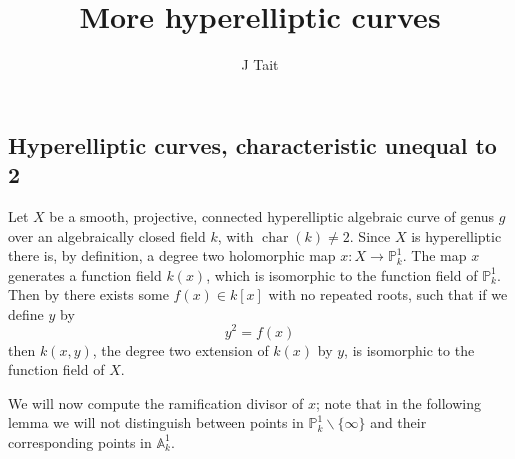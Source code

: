 \documentclass[11pt]{article} %
\title{More hyperelliptic curves}
\author{J Tait}
\theoremstyle{plain}
\theoremstyle{remark}
\DeclareMathOperator{\cha}{char}
\begin{document}
\maketitle

  \subsection{Hyperelliptic curves, characteristic unequal to 2}\label{charneq2}
  Let $X$ be a smooth, projective, connected hyperelliptic algebraic curve of genus $g$ over an algebraically closed field $k$, with $\cha (k) \neq 2$.
Since $X$ is hyperelliptic there is, by definition, a degree two holomorphic map $x:X\rightarrow \mathbb P_k^1$.
The map $x$ generates a function field $k(x)$, which is isomorphic to the function field of $\mathbb P_k^1$.
Then by \cite[\S 7.4.3]{liu} there exists some $f(x) \in k[x]$ with no repeated roots, such that if we define $y$ by
\begin{equation}\label{definingequation}
	y^2 = f(x)
\end{equation}
then $k(x,y)$, the degree two extension of $k(x)$ by $y$, is isomorphic to the function field of $X$.


We will now compute the ramification divisor of $x$; note that in the following lemma we will not distinguish between points in $\mathbb P_k^1\backslash \{\infty\}$ and their corresponding points in $\mathbb A_k^1$.
\end{document}

